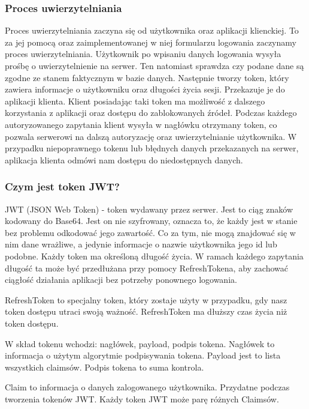 \documentclass[a4paper,twoside,12pt]{book}
\begin{document}
\subsubsection{Proces uwierzytelniania} 
Proces uwierzytelniania zaczyna się od użytkownika oraz aplikacji klienckiej. To za jej pomocą oraz zaimplementowanej w niej formularzu logowania zaczynamy proces uwierzytelniania. Użytkownik po wpisaniu danych logowania wysyła prośbę o uwierzytelnienie na serwer. Ten natomiast sprawdza czy podane dane są zgodne ze stanem faktycznym w bazie danych. Następnie tworzy token, który zawiera informacje o użytkowniku oraz długości życia sesji. Przekazuje je do aplikacji klienta. Klient posiadając taki token ma możliwość z dalszego korzystania z aplikacji oraz dostępu do zablokowanych źródeł. Podczas każdego autoryzowanego zapytania klient wysyła w nagłówku otrzymany token, co pozwala serwerowi na dalszą autoryzację oraz uwierzytelnianie użytkownika. W przypadku niepoprawnego tokenu lub błędnych danych przekazanych na serwer, aplikacja klienta odmówi nam dostępu do niedostępnych danych. 

\subsubsection{Czym jest token JWT?} 
JWT (JSON Web Token) - token wydawany przez serwer. Jest to ciąg znaków kodowany do Base64. Jest on nie szyfrowany, oznacza to, że każdy jest w stanie bez problemu odkodować jego zawartość. Co za tym, nie mogą znajdować się w nim dane wrażliwe, a jedynie informacje o nazwie użytkownika jego id lub podobne. Każdy token ma określoną długość życia. W ramach każdego zapytania długość ta może być przedłużana przy pomocy RefreshTokena, aby zachować ciągłość działania aplikacji bez potrzeby ponownego logowania.  

RefreshToken to specjalny token, który zostaje użyty w przypadku, gdy nasz token dostępu utraci swoją ważność. RefreshToken ma dłuższy czas życia niż token dostępu. 

W skład tokenu wchodzi: nagłówek, payload, podpis tokena. Nagłówek to informacja o użytym algorytmie podpisywania tokena. Payload jest to lista wszystkich claimsów. Podpis tokena to suma kontrola.

Claim to informacja o danych zalogowanego użytkownika. Przydatne podczas tworzenia tokenów JWT. Każdy token JWT może parę różnych Claimsów.  
\end{document}
